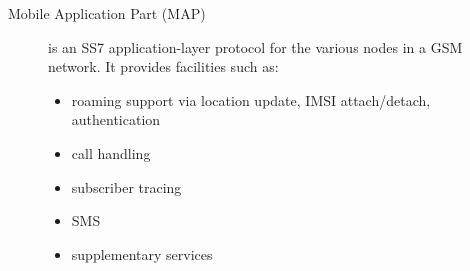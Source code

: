 \begin{description}
 \item [Mobile Application Part (MAP)] is an SS7 application-layer protocol for the various nodes in a GSM network.
 It provides facilities such as:
  \begin{itemize}
   \item roaming support via location update, IMSI attach/detach, authentication
   \item call handling
   \item subscriber tracing
   \item SMS
   \item supplementary services
  \end{itemize}

\end{description}



